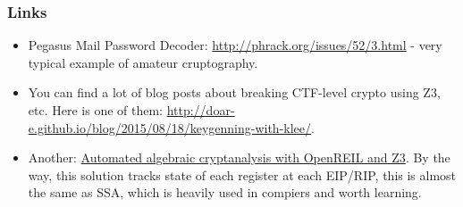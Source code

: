 \subsubsection{Links}

\begin{itemize}

\item Pegasus Mail Password Decoder: \url{http://phrack.org/issues/52/3.html} -
very typical example of amateur cruptography.

\item You can find a lot of blog posts about breaking CTF-level crypto using Z3, etc.
Here is one of them: \url{http://doar-e.github.io/blog/2015/08/18/keygenning-with-klee/}.

\item Another: \href{http://blog.cr4.sh/2015/03/automated-algebraic-cryptanalysis-with.html}{Automated algebraic cryptanalysis with OpenREIL and Z3}.
By the way, this solution tracks state of each register at each EIP/RIP, this is almost the same as \ac{SSA}, which is heavily used in compiers and worth learning.

\end{itemize}



